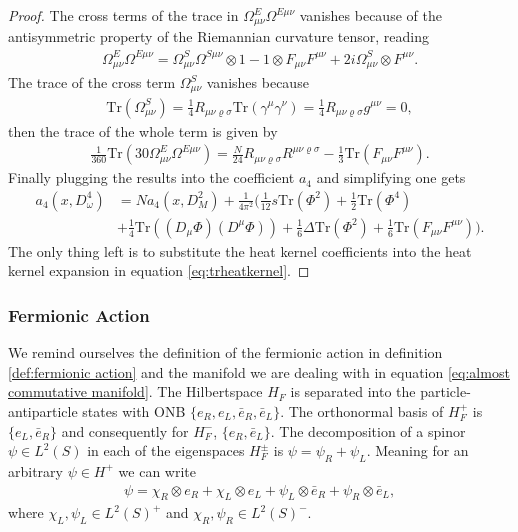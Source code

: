 \begin{proof}
     The cross terms of the trace in $\Omega_{\mu\nu}^E\Omega^{E\mu\nu}$
     vanishes because of the antisymmetric property of the Riemannian
     curvature tensor, reading
     \begin{align}
         \Omega_{\mu\nu}^E\Omega^{E\mu\nu} = \Omega_{\mu\nu}^S\Omega^{S\mu\nu}
         \otimes 1 - 1\otimes F_{\mu\nu}F^{\mu\nu} + 2i\Omega_{\mu\nu}^S
         \otimes F^{\mu\nu}.
     \end{align}
     The trace  of the cross term $\Omega^{S}_{\mu\nu}$ vanishes because
     \begin{align}
         \text{Tr}(\Omega^{S}_{\mu\nu}) = \frac{1}{4}
         R_{\mu\nu\varrho\sigma}\text{Tr}(\gamma^\mu\gamma^\nu) = \frac{1}{4}
         R_{\mu\nu\varrho\sigma}g^{\mu\nu} =0,
     \end{align}
     then the trace of the whole term is given by
     \begin{align}
         \frac{1}{360}\text{Tr}(30\Omega^E_{\mu\nu}\Omega^{E\mu\nu}) =
         \frac{N}{24}R_{\mu\nu\varrho\sigma}R^{\mu\nu\varrho\sigma}
         -\frac{1}{3}\text{Tr}(F_{\mu\nu}F^{\mu\nu}).
     \end{align}
     Finally plugging the results into the coefficient $a_4$ and simplifying
     one gets
     \begin{align}
         a_4(x, D_\omega^4) &= Na_4(x, D_M^2) + \frac{1}{4\pi^2}\bigg(\frac{1}{12} s
         \text{Tr}(\Phi^2) + \frac{1}{2}\text{Tr}(\Phi^4) \nonumber \\
         &+ \frac{1}{4}
         \text{Tr}((D_\mu\Phi)(D^\mu \Phi)) + \frac{1}{6}
         \Delta\text{Tr}(\Phi^2) + \frac{1}{6}
         \text{Tr}(F_{\mu\nu}F^{\mu\nu})\bigg).
     \end{align}
     The only thing left is to substitute the heat kernel coefficients into the
     heat kernel expansion in equation \eqref{eq:trheatkernel}.
\end{proof}

\subsubsection{Fermionic Action}
We remind ourselves the definition of the fermionic action in definition
\ref{def:fermionic action} and the manifold we are dealing with in equation
\eqref{eq:almost commutative manifold}. The Hilbertspace $H_F$ is separated
into the particle-antiparticle states with ONB $\{e_R, e_L, \bar{e}_R,
\bar{e}_L\}$. The orthonormal basis of $H_F^+$ is $\{e_L, \bar{e}_R\}$ and
consequently for $H_F^-$, $\{e_R, \bar{e}_L\}$. The decomposition of a spinor
$\psi \in L^2(S)$ in each of the eigenspaces $H_F^\pm$ is $\psi = \psi_R+
\psi_L$. Meaning for an arbitrary $\psi \in H^+$ we can write
\begin{align}
    \psi = \chi_R \otimes e_R + \chi_L \otimes e_L + \psi_L \otimes
    \bar{e}_R+
    \psi_R \otimes \bar{e}_L,
\end{align}
where $\chi_L, \psi_L \in L^2(S)^+$ and $\chi_R, \psi_R \in L^2(S)^-$.

